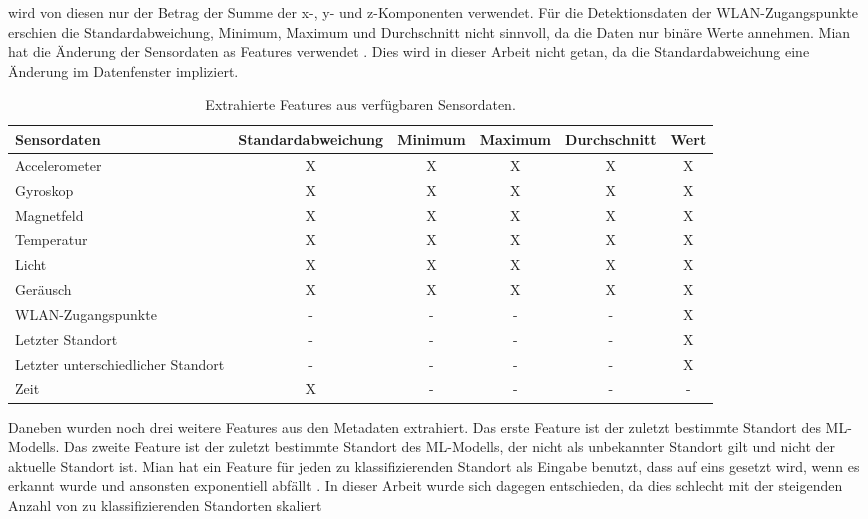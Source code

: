 wird von diesen nur der Betrag der Summe der x-, y- und z-Komponenten verwendet.
Für die Detektionsdaten der WLAN-Zugangspunkte erschien die Standardabweichung, Minimum, Maximum und Durchschnitt nicht sinnvoll, da die Daten nur binäre Werte annehmen.
Mian hat die Änderung der Sensordaten as Features verwendet \cite{naveedThesis}.
Dies wird in dieser Arbeit nicht getan, da die Standardabweichung eine Änderung im Datenfenster impliziert.
\begin{table}[h!]
    \hspace{-0.5cm}
    \begin{tabular}{ | p{3.2cm} | c | c | c | c | c | }
        \hline
        Sensordaten & Standardabweichung & Minimum & Maximum & Durchschnitt & Wert \\\hline
        Accelerometer & X & X & X & X & X \\\hline
        Gyroskop & X & X & X & X & X \\\hline
        Magnetfeld & X & X & X & X & X \\\hline
        Temperatur & X & X & X & X & X \\\hline
        Licht & X & X & X & X & X \\\hline
        Geräusch & X & X & X & X & X \\\hline
        WLAN-Zugangspunkte & - & - & - & - & X \\\hline
        Letzter Standort & - & - & - & - & X \\\hline
        Letzter unterschiedlicher Standort & - & - & - & - & X \\\hline
        Zeit & X & - & - & - & - \\\hline
    \end{tabular}
    \caption{Extrahierte Features aus verfügbaren Sensordaten.}
    \label{tab:all_features}
\end{table}
\newline
\newline
Daneben wurden noch drei weitere Features aus den Metadaten extrahiert.
Das erste Feature ist der zuletzt bestimmte Standort des ML-Modells.
Das zweite Feature ist der zuletzt bestimmte Standort des ML-Modells, der nicht als unbekannter Standort gilt und nicht der aktuelle Standort ist.
Mian hat ein Feature für jeden zu klassifizierenden Standort als Eingabe benutzt, dass auf eins gesetzt wird, wenn es erkannt wurde und ansonsten exponentiell abfällt \cite{naveedThesis}.
In dieser Arbeit wurde sich dagegen entschieden, da dies schlecht mit der steigenden Anzahl von zu klassifizierenden Standorten skaliert
